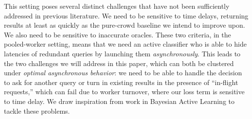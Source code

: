 This setting poses several distinct challenges that have not been sufficiently addressed in previous literature.
 We need to be sensitive to time delays, returning results at least as quickly as the pure-crowd baseline we intend to improve upon.
 We also need to be sensitive to inaccurate oracles.
 These two criteria, in the pooled-worker setting, means that we need an active classifier who is able to hide latencies of redundant queries by launching them \textit{asynchronously}.
 This leads to the two challenges we will address in this paper, which can both be clustered under \textit{optimal asynchronous behavior}: we need to be able to handle the decision to ask for another query or turn in existing results in the presence of ``in-flight requests,'' which can fail due to worker turnover, where our loss term is sensitive to time delay.
 We draw inspiration from work in Bayesian Active Learning to tackle these problems.



